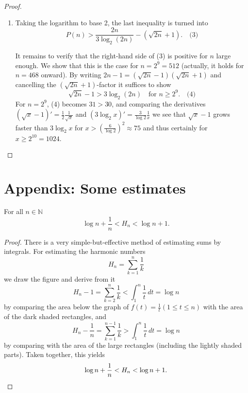 \begin{proof}
\begin{enumerate}
        Now, there are no more than \(\sqrt{2n}\) primes in the first factor; hence using (1) for the second factor and letting \(P(n)\) denote the number of primes between \(n\) and \(2n\) we get
        \[
        \frac{4^n}{2n} < ((2n)^{\sqrt{2n}}) \cdot (4^{\frac{2}{3}n}) \cdot (2n)^{P(n)},
        \]
        that is,
        \[
        4^{\frac{n}{3}} < (2n)^{\sqrt{2n}+1+P(n)}. \quad \text{(2)}
        \]

        \item Taking the logarithm to base 2, the last inequality is turned into
        \[
        P(n) > \frac{2n}{3 \log_2(2n)} - (\sqrt{2n} + 1). \quad \text{(3)}
        \]

        It remains to verify that the right-hand side of (3) is positive for \(n\) large enough. We show that this is the case for \(n = 2^9 = 512\) (actually, it holds for \(n = 468\) onward). By writing \(2n - 1 = (\sqrt{2n} - 1)(\sqrt{2n} + 1)\) and cancelling the \((\sqrt{2n} + 1)\)-factor it suffices to show
        \[
        \sqrt{2n}-1 > 3 \log_2(2n) \quad \text{for } n \ge 2^9. \quad \text{(4)}
        \]
        For \(n = 2^9\), (4) becomes \(31 > 30\), and comparing the derivatives \((\sqrt{x}-1)' = \frac{1}{2} \frac{1}{\sqrt{x}}\) and \((3 \log_2 x)' = \frac{3}{\log 2} \frac{1}{x}\) we see that \(\sqrt{x} - 1\) grows faster than \(3 \log_2 x\) for \(x > (\frac{6}{\log 2})^2 \approx 75\) and thus certainly for \(x \ge 2^{10} = 1024.\) \qedhere
    \end{enumerate}
\end{proof}

\section{Appendix: Some estimates}

\begin{theorem}
    \label{thm:estimate_integral}
    \leanok
    For all \(n \in \mathbb{N}\)
    \[
    \log n + \frac 1 n < H_n < \log n + 1.
    \]
\end{theorem}
\begin{proof}
    There is a very simple-but-effective method of estimating sums by integrals. For estimating the harmonic numbers
    \[
    H_n = \sum_{k=1}^{n} \frac{1}{k}
    \]
    we draw the figure and derive from it
    \[
    H_n - 1 = \sum_{k=2}^{n} \frac{1}{k} < \int_{1}^{n} \frac{1}{t} \, dt = \log n
    \]
    by comparing the area below the graph of $f(t) = \frac{1}{t} (1 \le t \le n)$ with the area of the dark shaded rectangles, and
    \[
    H_n - \frac{1}{n} = \sum_{k=1}^{n-1} \frac{1}{k} > \int_{1}^{n} \frac{1}{t} \, dt = \log n
    \]
    by comparing with the area of the large rectangles (including the lightly shaded parts). Taken together, this yields
    \[
    \log n + \frac{1}{n} < H_n < \log n + 1. \qedhere
    \]
\end{proof}



